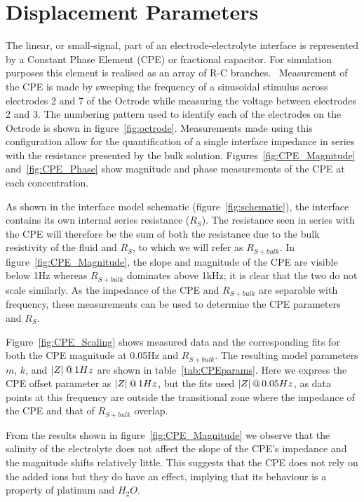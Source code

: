 \documentclass[10pt,final,journal]{IEEEtran}
\begin{document}
\section{Displacement Parameters}
The linear, or small-signal, part of an electrode-electrolyte interface is represented by a Constant Phase Element (CPE) or fractional capacitor. For simulation purposes this element is realised as an array of R-C branches.~\cite{ScottSingle2013,Morrison59,Elwakil10} Measurement of the CPE is made by sweeping the frequency of a sinusoidal stimulus across electrodes 2 and 7 of the Octrode while measuring the voltage between electrodes 2 and 3. The numbering pattern used to identify each of the electrodes on the Octrode is shown in figure~\ref{fig:octrode}.
Measurements made using this configuration allow for the quantification of a single interface impedance in series with the resistance presented by the bulk solution. 
Figures~\ref{fig:CPE_Magnitude} and~\ref{fig:CPE_Phase} show magnitude and phase measurements of the CPE at each concentration.

As shown in the interface model schematic (figure~\ref{fig:schematic}), the interface contains its own internal series resistance ($R_{S}$). The resistance seen in series with the CPE will therefore be the sum of both the resistance due to the bulk resistivity of the fluid and $R_{S}$, to which we will refer as $R_{S+bulk}$.
In figure~\ref{fig:CPE_Magnitude}, the slope and magnitude of the CPE are visible below 1\thinspace Hz whereas $R_{S+bulk}$  dominates above 1\thinspace kHz; it is clear that the two do not scale similarly.
As the impedance of the CPE and $R_{S+bulk}$ are separable with frequency, these measurements can be used to determine the CPE parameters and $R_{S}$.

Figure~\ref{fig:CPE_Scaling} shows measured data and the corresponding fits for both the CPE magnitude at 0.05\thinspace Hz and $R_{S+bulk}$. 
The resulting model parameters $m$, $k$, and $|Z|\thinspace @\thinspace 1Hz$ are shown in table~\ref{tab:CPEparams}. Here we express the CPE offset parameter as $|Z|\thinspace @ \thinspace 1Hz$, but the fits used $|Z|\thinspace @ \thinspace 0.05Hz$, as data points at this frequency are outside the transitional zone where the impedance of the CPE and that of $R_{S+bulk}$ overlap. 

From the results shown in figure~\ref{fig:CPE_Magnitude} we observe that the salinity of the electrolyte does not affect the slope of the CPE's impedance and the magnitude shifts relatively little. This suggests that the CPE does not rely on the added ions but they do have an effect, implying that its behaviour is a property of platinum and $H_{2}O$.
\end{document}
